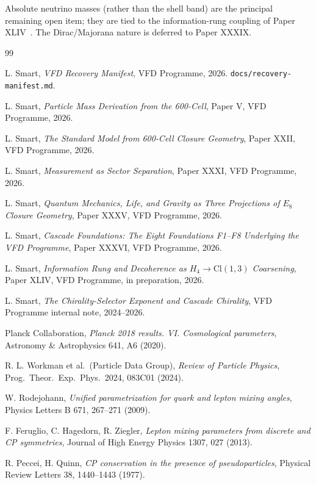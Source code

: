 \documentclass[12pt]{article}
\theoremstyle{definition}
\theoremstyle{remark}
\begin{document}
Absolute neutrino masses (rather than the shell band) are the principal remaining open item; they are tied to the information-rung coupling of Paper XLIV~\citep{SmartXLIV}. The Dirac/Majorana nature is deferred to Paper XXXIX.


\begin{thebibliography}{99}

 L. Smart, \emph{VFD Recovery Manifest}, VFD Programme, 2026. \texttt{docs/recovery-manifest.md}.

 L. Smart, \emph{Particle Mass Derivation from the 600-Cell}, Paper V, VFD Programme, 2026.

 L. Smart, \emph{The Standard Model from 600-Cell Closure Geometry}, Paper XXII, VFD Programme, 2026.

 L. Smart, \emph{Measurement as Sector Separation}, Paper XXXI, VFD Programme, 2026.

 L. Smart, \emph{Quantum Mechanics, Life, and Gravity as Three Projections of $E_8$ Closure Geometry}, Paper XXXV, VFD Programme, 2026.

 L. Smart, \emph{Cascade Foundations: The Eight Foundations F1--F8 Underlying the VFD Programme}, Paper XXXVI, VFD Programme, 2026.

 L. Smart, \emph{Information Rung and Decoherence as $H_4 \to \mathrm{Cl}(1,3)$ Coarsening}, Paper XLIV, VFD Programme, in preparation, 2026.

 L. Smart, \emph{The Chirality-Selector Exponent and Cascade Chirality}, VFD Programme internal note, 2024--2026.

 Planck Collaboration, \emph{Planck 2018 results. VI. Cosmological parameters}, Astronomy \& Astrophysics 641, A6 (2020).

 R. L. Workman et al.\ (Particle Data Group), \emph{Review of Particle Physics}, Prog.\ Theor.\ Exp.\ Phys.\ 2024, 083C01 (2024).

 W. Rodejohann, \emph{Unified parametrization for quark and lepton mixing angles}, Physics Letters B 671, 267--271 (2009).

 F. Feruglio, C. Hagedorn, R. Ziegler, \emph{Lepton mixing parameters from discrete and CP symmetries}, Journal of High Energy Physics 1307, 027 (2013).

 R. Peccei, H. Quinn, \emph{CP conservation in the presence of pseudoparticles}, Physical Review Letters 38, 1440--1443 (1977).

\end{thebibliography}
\end{document}
